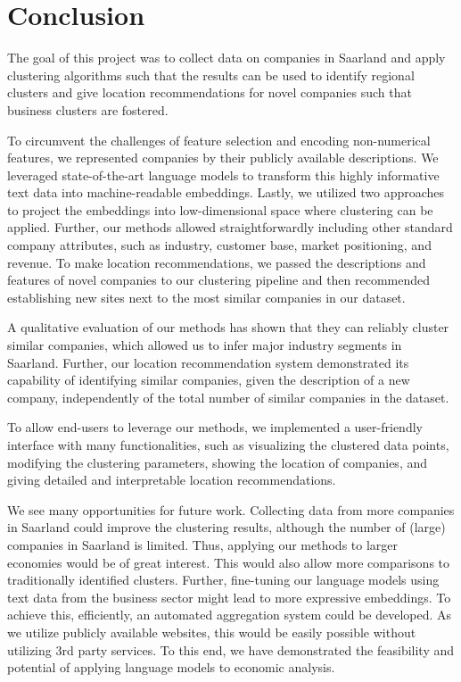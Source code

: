 \documentclass[conference]{IEEEtran}
\begin{document}
\section{Conclusion}
The goal of this project was to collect data on companies in Saarland and apply clustering algorithms such that the results can be used to identify regional clusters and give location recommendations for novel companies such that business clusters are fostered.

To circumvent the challenges of feature selection and encoding non-numerical features, we represented companies by their publicly available descriptions. We leveraged state-of-the-art language models to transform this highly informative text data into machine-readable embeddings. Lastly, we utilized two approaches to project the embeddings into low-dimensional space where clustering can be applied.
Further, our methods allowed straightforwardly including other standard company attributes, such as industry, customer base, market positioning, and revenue. 
To make location recommendations, we passed the descriptions and features of novel companies to our clustering pipeline and then recommended establishing new sites next to the most similar companies in our dataset.

A qualitative evaluation of our methods has shown that they can reliably cluster similar companies, which allowed us to infer major industry segments in Saarland. Further, our location recommendation system demonstrated its capability of identifying similar companies, given the description of a new company, independently of the total number of similar companies in the dataset.

To allow end-users to leverage our methods, we implemented a user-friendly interface with many functionalities, such as visualizing the clustered data points, modifying the clustering parameters, showing the location of companies, and giving detailed and interpretable location recommendations.

We see many opportunities for future work. Collecting data from more companies in Saarland could improve the clustering results, although the number of (large) companies in Saarland is limited. Thus, applying our methods to larger economies would be of great interest. This would also allow more comparisons to traditionally identified clusters. Further, fine-tuning our language models using text data from the business sector might lead to more expressive embeddings. To achieve this, efficiently, an automated aggregation system could be developed. As we utilize publicly available websites, this would be easily possible without utilizing 3rd party services.
To this end, we have demonstrated the feasibility and potential of applying language models to economic analysis.
\end{document}
